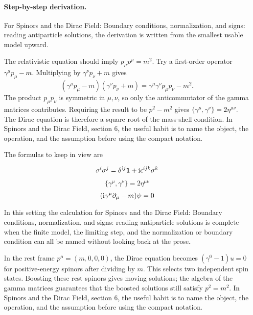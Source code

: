 \paragraph{Step-by-step derivation.}

For Spinors and the Dirac Field: Boundary conditions, normalization, and signs: reading antiparticle solutions, the derivation is written from the smallest usable model upward.

The relativistic equation should imply \(p_\mu p^\mu=m^2\).  Try a first-order operator \(\gamma^\mu p_\mu-m\).  Multiplying by \(\gamma^\nu p_\nu+m\) gives
\[
  (\gamma^\mu p_\mu-m)(\gamma^\nu p_\nu+m)
  =
  \gamma^\mu\gamma^\nu p_\mu p_\nu-m^2.
\]
The product \(p_\mu p_\nu\) is symmetric in \(\mu,\nu\), so only the anticommutator of the gamma matrices contributes.  Requiring the result to be \(p^2-m^2\) gives \(\{\gamma^\mu,\gamma^\nu\}=2\eta^{\mu\nu}\).  The Dirac equation is therefore a square root of the mass-shell condition.  In Spinors and the Dirac Field, section 6, the useful habit is to name the object, the operation, and the assumption before using the compact notation.

The formulas to keep in view are

\[
  \sigma^i\sigma^j=\delta^{ij}\mathbf 1+\mathrm i\epsilon^{ijk}\sigma^k
\]
\[
  \{\gamma^\mu,\gamma^\nu\}=2\eta^{\mu\nu}
\]
\[
  (\mathrm i\gamma^\mu\partial_\mu-m)\psi=0
\]

In this setting the calculation for Spinors and the Dirac Field: Boundary conditions, normalization, and signs: reading antiparticle solutions is complete when the finite model, the limiting step, and the normalization or boundary condition can all be named without looking back at the prose.




\begin{example}
In the rest frame \(p^\mu=(m,0,0,0)\), the Dirac equation becomes \((\gamma^0-1)u=0\) for positive-energy spinors after dividing by \(m\).  This selects two independent spin states.  Boosting these rest spinors gives moving solutions; the algebra of the gamma matrices guarantees that the boosted solutions still satisfy \(p^2=m^2\).  In Spinors and the Dirac Field, section 6, the useful habit is to name the object, the operation, and the assumption before using the compact notation.
\end{example}




